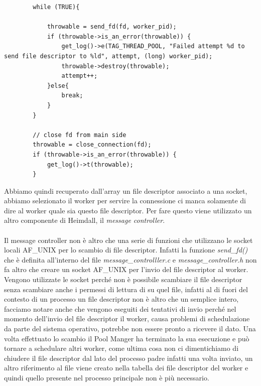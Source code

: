 \documentclass[italian]{tktltiki2}
\begin{document}
\begin{lstlisting}
		while (TRUE){
		            
			throwable = send_fd(fd, worker_pid);
			if (throwable->is_an_error(throwable)) {
				get_log()->e(TAG_THREAD_POOL, "Failed attempt %d to send file descriptor to %ld", attempt, (long) worker_pid);
				throwable->destroy(throwable);
				attempt++;
			}else{
				break;
			}
		}

		// close fd from main side
		throwable = close_connection(fd);
        if (throwable->is_an_error(throwable)) {
            get_log()->t(throwable);
        }
\end{lstlisting}
Abbiamo quindi recuperato dall'array un file descriptor associato a una socket, abbiamo selezionato il worker per servire la connessione ci manca solamente di dire al worker quale sia questo file descriptor. Per fare questo viene utilizzato un altro componente di Heimdall, il \emph{message controller}.\\\\ Il message controller non è altro che una serie di funzioni che utilizzano le socket locali AF\_UNIX per lo scambio di file descriptor. Infatti la funzione \emph{send\_fd()} che è definita all'interno del file \emph{message\_controlller.c} e \emph{message\_controller.h} non fa altro che creare un socket AF\_UNIX per l'invio del file descriptor al worker. Vengono utilizzate le socket perché non è possibile scambiare il file descriptor senza scambiare anche i permessi di lettura di su quel file, infatti al di fuori del contesto di un processo un file descriptor non è altro che un semplice intero, facciamo notare anche che vengono eseguiti dei tentativi di invio perché nel momento dell'invio del file descriptor il worker, causa problemi di schedulazione da parte del sistema operativo, potrebbe non essere pronto a ricevere il dato. Una volta effettuato lo scambio il Pool Manger ha terminato la sua esecuzione e può tornare a schedulare altri worker, come ultima cosa non ci dimentichiamo di chiudere il file descriptor dal lato del processo padre infatti una volta inviato, un altro riferimento al file viene creato nella tabella dei file descriptor del worker e quindi quello presente nel processo principale non è più necessario.
\end{document}
